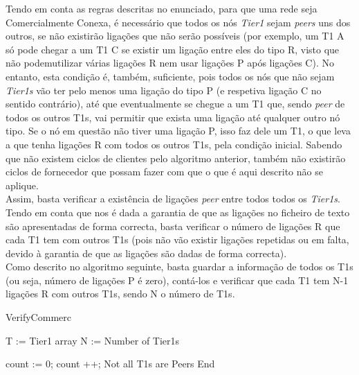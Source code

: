 \documentclass[twocolumn]{article} %
\begin{document}
			Tendo em conta as regras descritas no enunciado, para que uma rede seja Comercialmente Conexa, é necessário que todos os nós \emph{Tier1} sejam \emph{peers} uns dos outros, se não existirão ligações que não serão possíveis (por exemplo, um T1 A só pode chegar a um T1 C se existir um ligação entre eles do tipo R, visto que não podemutilizar várias ligações R nem usar ligações P após ligações C). No entanto, esta condição é, também, suficiente, pois todos os nós que não sejam \emph{Tier1s} vão ter pelo menos uma ligação do tipo P (e respetiva ligação C no sentido contrário), até que eventualmente se chegue a um T1 que, sendo \emph{peer} de todos os outros T1s, vai permitir que exista uma ligação até qualquer outro nó tipo. Se o nó em questão não tiver uma ligação P, isso faz dele um T1, o que leva a que tenha ligações R com todos os outros T1s, pela condição inicial. Sabendo que não existem ciclos de clientes pelo algoritmo anterior, também não existirão ciclos de fornecedor que possam fazer com que o que é aqui descrito não se aplique.\\

			\noindent Assim, basta verificar a existência de ligações \emph{peer} entre todos todos os \emph{Tier1s}. Tendo em conta que nos é dada a garantia de que as ligações no ficheiro de texto são apresentadas de forma correcta, basta verificar o número de ligações R que cada T1 tem com  outros T1s (pois não vão existir ligações repetidas ou em falta, devido à garantia de que as ligações são dadas de forma correcta).\\
			\noindent Como descrito no algoritmo seguinte, basta guardar a informação de todos os T1s (ou seja, número de ligações P é zero), contá-los e verificar que cada T1 tem N-1 ligações R com outros T1s, sendo N o número de T1s.\\


			\begin{algorithm}[htbp]
			\caption{VerifyCommerc}
			\begin{algorithmic}[1]
				
				\State T := Tier1 array
				\State N := Number of Tier1s

					\State count := 0;
							\State count ++; 
						\EndIf
					\EndFor
						\State Not all T1s are Peers
						\State End
					\EndIf
				\EndFor
			\end{algorithmic}
			\end{algorithm}
\end{document}
